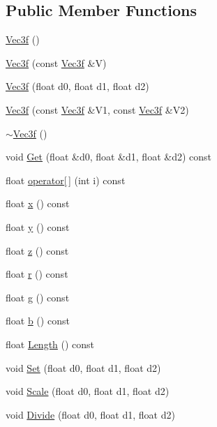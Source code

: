 \subsection*{Public Member Functions}
\begin{DoxyCompactItemize}
\item 
\hyperlink{classVec3f_af874d7517d0a628834c6d753aa516325}{Vec3f} ()
\item 
\hyperlink{classVec3f_abcc90a8786e61b9ae87d47f2c3c34acd}{Vec3f} (const \hyperlink{classVec3f}{Vec3f} \&V)
\item 
\hyperlink{classVec3f_ad1b720bbc0088455823bfc2816789a2d}{Vec3f} (float d0, float d1, float d2)
\item 
\hyperlink{classVec3f_a5cddc92d35168ffaf9838fd661ab3d00}{Vec3f} (const \hyperlink{classVec3f}{Vec3f} \&V1, const \hyperlink{classVec3f}{Vec3f} \&V2)
\item 
\hyperlink{classVec3f_a8852cfe67109ea137f7387c6934a0268}{$\sim$\+Vec3f} ()
\item 
void \hyperlink{classVec3f_adc04e55fbdab76f77e2c6b2e3243a489}{Get} (float \&d0, float \&d1, float \&d2) const 
\item 
float \hyperlink{classVec3f_a8e50e8a857f6587f04402b9447274e2f}{operator\mbox{[}$\,$\mbox{]}} (int i) const 
\item 
float \hyperlink{classVec3f_a5c39b153bc4ba10503efbc98932c51d5}{x} () const 
\item 
float \hyperlink{classVec3f_a4d9122de39a48f6f18ba4184289b6cc0}{y} () const 
\item 
float \hyperlink{classVec3f_a1e1ebbacd37cdd207a1d4b5dd9f2e80b}{z} () const 
\item 
float \hyperlink{classVec3f_aed70ad9eb39c47e2f90435de470d5779}{r} () const 
\item 
float \hyperlink{classVec3f_ad72c43c133ef70d2ddbc283e6c0a9229}{g} () const 
\item 
float \hyperlink{classVec3f_a022e6dd724965fa27ba4a448f54a66fe}{b} () const 
\item 
float \hyperlink{classVec3f_a4e785c2c10a9d63dc8579c5a00ed60d1}{Length} () const 
\item 
void \hyperlink{classVec3f_a5271259ed70023efa9109f0ec717f3be}{Set} (float d0, float d1, float d2)
\item 
void \hyperlink{classVec3f_a8a919312d46e28ef591d832e4b7d5896}{Scale} (float d0, float d1, float d2)
\item 
void \hyperlink{classVec3f_a741c1fcfc370c8f07610fb19bd6e5591}{Divide} (float d0, float d1, float d2)

\end{DoxyCompactItemize}
